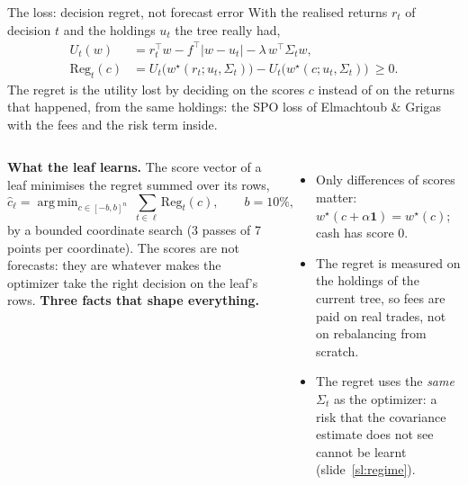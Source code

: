 \documentclass[10pt,aspectratio=169]{beamer}
\newcommand{\1}{\mathbf{1}}
\newcommand{\Reg}{\mathrm{Reg}}
\DeclareMathOperator*{\argmin}{arg\,min}
\begin{document}
\begin{frame}{The loss: decision regret, not forecast error}
With the realised returns $r_t$ of decision $t$ and the holdings $u_t$ the tree really had,
\begin{align*}
U_t(w)&=r_t^\top w-f^\top|w-u_t|-\lambda\,w^\top\Sigma_t w,\\
\Reg_t(c)&=U_t\big(w^\star(r_t;u_t,\Sigma_t)\big)-U_t\big(w^\star(c;u_t,\Sigma_t)\big)\ \ge 0 .
\end{align*}
The regret is the utility lost by deciding on the scores $c$ instead of on the returns that happened, from the same holdings: the SPO loss of Elmachtoub \& Grigas with the fees and the risk term inside.

\medskip\small
\begin{columns}[T]
\textbf{What the leaf learns.} The score vector of a leaf minimises the regret summed over its rows,
\[
\hat c_\ell=\argmin_{c\in[-b,b]^n}\ \sum_{t\in\ell}\Reg_t(c),\qquad b=10\%,
\]
by a bounded coordinate search (3 passes of 7 points per coordinate). The scores are not forecasts: they are whatever makes the optimizer take the right decision on the leaf's rows.
\textbf{Three facts that shape everything.}
\begin{itemize}
\item Only differences of scores matter: $w^\star(c+\alpha\1)=w^\star(c)$; cash has score $0$.
\item The regret is measured on the holdings of the current tree, so fees are paid on real trades, not on rebalancing from scratch.
\item The regret uses the \emph{same} $\Sigma_t$ as the optimizer: a risk that the covariance estimate does not see cannot be learnt (slide~\ref{sl:regime}).
\end{itemize}
\end{columns}
\end{frame}
\end{document}
